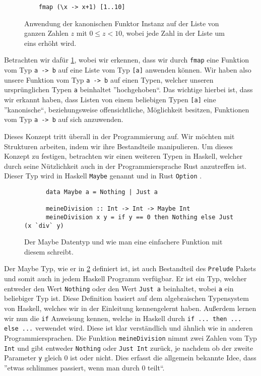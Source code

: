 \documentclass{hhuarticle}
\theoremstyle{definition}
\theoremstyle{theorem}
\begin{document}
  \begin{figure}[h]
    \begin{verbatim}
    fmap (\x -> x+1) [1..10]
    \end{verbatim}
    \caption{Anwendung der kanonischen Funktor Instanz auf der Liste von ganzen Zahlen $z$ mit $0\le z < 10$, wobei jede Zahl in der Liste um eins erhöht wird.}%
    \label{fig:fmapExample}
  \end{figure}

  Betrachten wir dafür \cref{fig:fmapExample}, wobei wir erkennen,
  dass wir durch \verb|fmap| eine Funktion vom Typ \verb|a -> b| auf
  eine Liste vom Typ \verb|[a]| anwenden können. Wir haben also unsere
  Funktion vom Typ \verb|a -> b| auf einen Typen, welcher unseren
  ursprünglichen Typen \verb|a| beinhaltet ''hochgehoben``.
  Das wichtige hierbei ist, dass wir erkannt haben, dass Listen von einem
  beliebigen Typen \verb|[a]| eine ''kanonische``, beziehungsweise offensichtliche,
  Möglichkeit besitzen, Funktionen vom Typ \verb|a -> b| auf sich anzuwenden.

  Dieses Konzept tritt überall in der Programmierung auf. Wir möchten
  mit Strukturen arbeiten, indem wir ihre Bestandteile manipulieren.
  Um dieses Konzept zu festigen, betrachten wir einen weiteren Typen in
  Haskell, welcher durch seine Nützlichkeit auch in der Programmiersprache
  Rust anzutreffen ist. Dieser Typ wird in Haskell \verb|Maybe| genannt
  und in Rust \verb|Option| \cite{rustOption}.

  \begin{figure}[h]
    \begin{verbatim}
      data Maybe a = Nothing | Just a

      meineDivision :: Int -> Int -> Maybe Int
      meineDivision x y = if y == 0 then Nothing else Just (x `div` y)
    \end{verbatim}
    \caption{Der Maybe Datentyp und wie man eine einfachere Funktion mit diesem schreibt.}%
    \label{fig:maybeType}
  \end{figure}

  Der Maybe Typ, wie er in \cref{fig:maybeType} definiert ist, ist auch
  Bestandteil des \verb|Prelude| Pakets und somit auch in jedem Haskell
  Programm verfügbar. Er ist ein Typ, welcher entweder den Wert \verb|Nothing|
  oder den Wert \verb|Just a| beinhaltet, wobei \verb|a| ein beliebiger Typ ist.
  Diese Definition basiert auf dem algebraischen Typensystem von Haskell,
  welches wir in der Einleitung kennengelernt haben.
  Außerdem lernen wir nun die \verb|if| Anweisung kennen, welche
  in Haskell durch \verb|if ... then ... else ...| verwendet wird.
  Diese ist klar verständlich und ähnlich wie in anderen Programmiersprachen.
  Die Funktion \verb|meineDivision| nimmt zwei Zahlen vom Typ \verb|Int| und
  gibt entweder \verb|Nothing| oder \verb|Just Int| zurück,
  je nachdem ob der zweite Parameter \verb|y| gleich $0$ ist oder nicht.
  Dies erfasst die allgemein bekannte Idee, dass ''etwas schlimmes passiert,
  wenn man durch $0$ teilt``.
\end{document}

